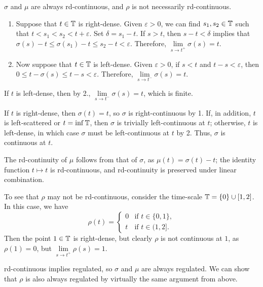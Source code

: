 \documentclass[nonumber, anonymous]{homework}
\begin{document}
	
	$\sigma$ and $\mu$ are always rd-continuous, and $\rho$ is not necessarily rd-continuous.
	
	\begin{enumerate}
		\item Suppose that $t \in \mathbb{T}$ is right-dense. Given $\varepsilon>0$, we can find $s_1,s_2 \in \mathbb{T}$ such that $t < s_1 < s_2 < t + \varepsilon$. Set $\delta = s_1 -t$. If $s > t$, then $s -t < \delta$ implies that $\sigma(s) - t \le \sigma(s_1) - t \le s_2 - t < \varepsilon$. Therefore, $\lim\limits_{s\to t^+}\sigma(s) = t$.
		
		\item Now suppose that $t \in \mathbb{T}$ is left-dense. Given $\varepsilon > 0$, if $s < t$ and $t -s < \varepsilon$, then $0 \le t - \sigma(s) \le t - s < \varepsilon$. Therefore, $\lim\limits_{s\to t^-}\sigma(s) = t$.
	\end{enumerate}
	
	If $t$ is left-dense, then by 2., $\lim\limits_{s\to t^-}\sigma(s) = t$, which is finite. 
	
	If $t$ is right-dense, then $\sigma(t) = t$, so $\sigma$ is right-continuous by 1. If, in addition, $t$ is left-scattered or $t = \inf\mathbb{T}$, then $\sigma$ is trivially left-continuous at $t$; otherwise, $t$ is left-dense, in which case $\sigma$ must be left-continuous at $t$ by 2. Thus, $\sigma$ is continuous at $t$.
	
	The rd-continuity of $\mu$ follows from that of $\sigma$, as $\mu(t) = \sigma(t) - t$; the identity function $t \mapsto t$ is rd-continuous, and rd-continuity is preserved under linear combination.
	
	To see that $\rho$ may not be rd-continuous, consider the time-scale $\mathbb{T} = \{0\}\cup[1,2]$. In this case, we have
	\begin{equation*}
		\rho(t) = \begin{cases}
			0 & \text{if } t \in \{0, 1\}, \\
			t & \text{if } t \in (1,2].
		\end{cases}
	\end{equation*}
	Then the point $1 \in \mathbb{T}$ is right-dense, but clearly $\rho$ is not continuous at $1$, as $\rho(1) = 0$, but $\lim\limits_{s\to t^+}\rho(s) = 1$.
	
	
	
	rd-continuous implies regulated, so $\sigma$ and $\mu$ are always regulated. We can show that $\rho$ is also always regulated by virtually the same argument from above.
	
\end{document}
